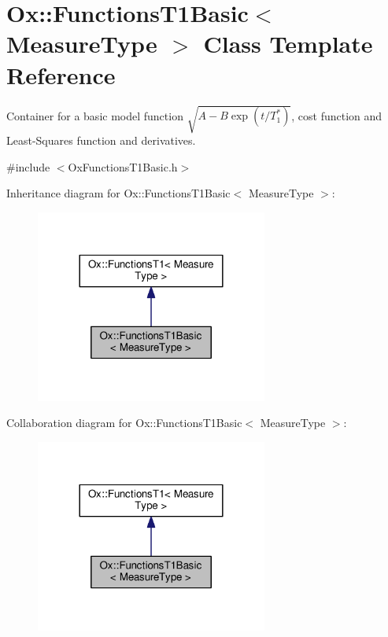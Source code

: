 \hypertarget{class_ox_1_1_functions_t1_basic}{\section{Ox\-:\-:Functions\-T1\-Basic$<$ Measure\-Type $>$ Class Template Reference}
\label{class_ox_1_1_functions_t1_basic}
}


Container for a basic model function $\sqrt{A-B\exp(t/T_1^*)}$, cost function and Least-\/\-Squares function and derivatives.  




{\ttfamily \#include $<$Ox\-Functions\-T1\-Basic.\-h$>$}



Inheritance diagram for Ox\-:\-:Functions\-T1\-Basic$<$ Measure\-Type $>$\-:
\nopagebreak
\begin{figure}[H]
\begin{center}
\leavevmode
\includegraphics[width=216pt]{class_ox_1_1_functions_t1_basic__inherit__graph}
\end{center}
\end{figure}


Collaboration diagram for Ox\-:\-:Functions\-T1\-Basic$<$ Measure\-Type $>$\-:
\nopagebreak
\begin{figure}[H]
\begin{center}
\leavevmode
\includegraphics[width=216pt]{class_ox_1_1_functions_t1_basic__coll__graph}
\end{center}
\end{figure}
